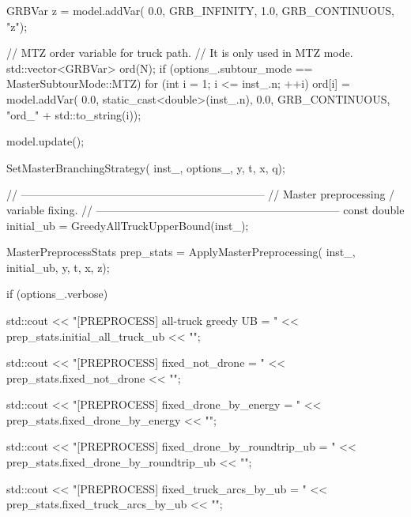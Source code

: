 {{{            GRBVar z = model.addVar(
                0.0,
                GRB_INFINITY,
                1.0,
                GRB_CONTINUOUS,
                "z");

            // MTZ order variable for truck path.
            // It is only used in MTZ mode.
            std::vector<GRBVar> ord(N);
            if (options_.subtour_mode == MasterSubtourMode::MTZ)
            {
                for (int i = 1; i <= inst_.n; ++i)
                {
                    ord[i] = model.addVar(
                        0.0,
                        static_cast<double>(inst_.n),
                        0.0,
                        GRB_CONTINUOUS,
                        "ord_" + std::to_string(i));
                }
            }

            model.update();

            SetMasterBranchingStrategy(
                inst_,
                options_,
                y,
                t,
                x,
                q);

            // ------------------------------------------------------------------
            // Master preprocessing / variable fixing.
            // ------------------------------------------------------------------
            const double initial_ub = GreedyAllTruckUpperBound(inst_);

            MasterPreprocessStats prep_stats = ApplyMasterPreprocessing(
                inst_,
                initial_ub,
                y,
                t,
                x,
                z);

            if (options_.verbose)
            {
                std::cout << "[PREPROCESS] all-truck greedy UB = "
                          << prep_stats.initial_all_truck_ub << "\n";

                std::cout << "[PREPROCESS] fixed_not_drone = "
                          << prep_stats.fixed_not_drone << "\n";

                std::cout << "[PREPROCESS] fixed_drone_by_energy = "
                          << prep_stats.fixed_drone_by_energy << "\n";

                std::cout << "[PREPROCESS] fixed_drone_by_roundtrip_ub = "
                          << prep_stats.fixed_drone_by_roundtrip_ub << "\n";

                std::cout << "[PREPROCESS] fixed_truck_arcs_by_ub = "
                          << prep_stats.fixed_truck_arcs_by_ub << "\n";
            }

}}}
